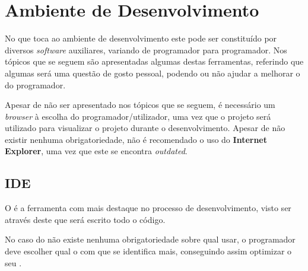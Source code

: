 \section{Ambiente de Desenvolvimento}

No que toca ao ambiente de desenvolvimento este pode ser constituído por diversos \textit{software} auxiliares, variando de programador para programador. Nos tópicos que se seguem são apresentadas algumas destas ferramentas, referindo que algumas será uma questão de gosto pessoal, podendo ou não ajudar a melhorar o \textit{} do programador.

Apesar de não ser apresentado nos tópicos que se seguem, é necessário um \textit{browser} à escolha do programador/utilizador, uma vez que o projeto será utilizado para visualizar o projeto durante o desenvolvimento. Apesar de não existir nenhuma obrigatoriedade, não é recomendado o uso do \textbf{Internet Explorer}, uma vez que este se encontra \textit{outdated}.

\subsection{IDE}

O  é a ferramenta com mais destaque no processo de desenvolvimento, visto ser através deste que será escrito todo o código.

No caso do  não existe nenhuma obrigatoriedade sobre qual usar, o programador deve escolher qual o  com que se identifica mais, conseguindo assim optimizar o seu \textit{}.







